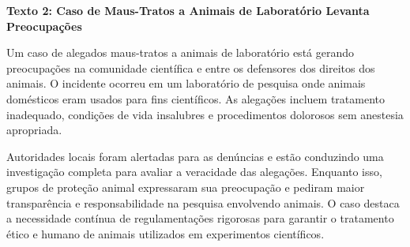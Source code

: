 
\begin{myquote}







\textbf{Texto 2: Caso de Maus-Tratos a Animais de Laboratório Levanta Preocupações}

Um caso de alegados maus-tratos a animais de laboratório
está gerando preocupações na comunidade científica e entre os defensores dos
direitos dos animais. O incidente ocorreu em um laboratório de pesquisa onde
animais domésticos eram usados para fins científicos. As alegações incluem
tratamento inadequado, condições de vida insalubres e procedimentos dolorosos
sem anestesia apropriada.

Autoridades locais foram alertadas para as denúncias e estão conduzindo uma
investigação completa para avaliar a veracidade das alegações. Enquanto isso,
grupos de proteção animal expressaram sua preocupação e pediram maior
transparência e responsabilidade na pesquisa envolvendo animais. O caso
destaca a necessidade contínua de regulamentações rigorosas para garantir o
tratamento ético e humano de animais utilizados em experimentos científicos.


\end{myquote}

